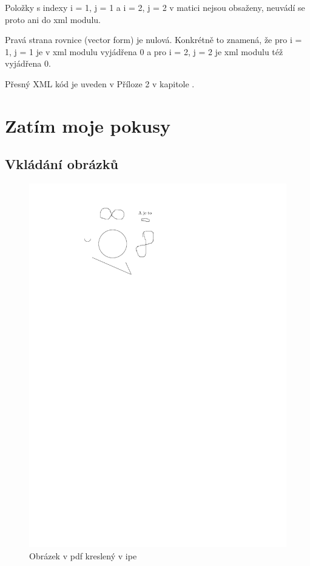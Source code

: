 \documentclass[12pt,a4paper,oneside]{article}
\numberwithin{equation}{section} %
\numberwithin{figure}{section} %
\numberwithin{table}{section} %
\begin{document}
Položky s indexy i = 1, j = 1 a i = 2, j = 2 v matici nejsou obsaženy, neuvádí se proto ani do xml modulu.

Pravá strana rovnice (vector form) je nulová. Konkrétně to znamená, že pro i = 1, j = 1 je v xml modulu vyjádřena $0$ a pro i = 2, j = 2 je xml modulu též vyjádřena $0$.

Přesný XML kód je uveden v Příloze 2 v kapitole .





\clearpage
\section{Zatím moje pokusy}
\subsection{Vkládání obrázků}
\begin{figure}[h] %
\begin{center}
\includegraphics{Obrzkusmo.pdf}
\caption{Obrázek v pdf kreslený v ipe} %
\end{center}
\end{figure}
\end{document}
